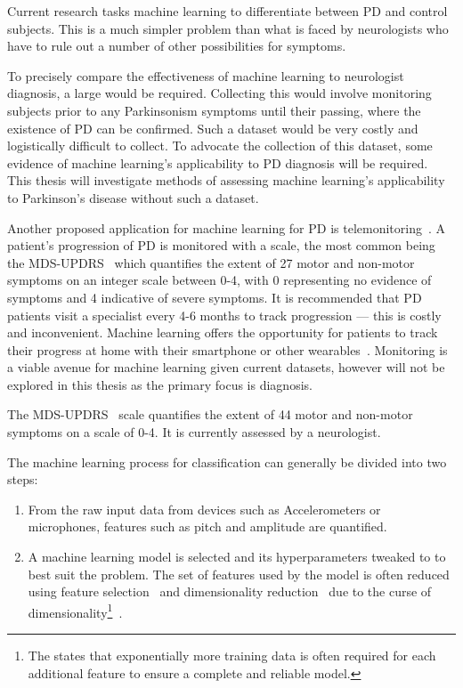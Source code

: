\documentclass[12pt, twoside]{book}
\renewcommand\emph[1]{\textit{\color{USred}{#1}}}
\begin{document}
\begin{highlight}
Current research tasks machine learning to differentiate between PD and control subjects. This is a much simpler problem than what is faced by neurologists who have to rule out a number of other possibilities for symptoms.
\end{highlight}

To precisely compare the effectiveness of machine learning to neurologist diagnosis, a large \emph{longitudinal dataset} would be required. Collecting this would involve monitoring subjects prior to any Parkinsonism symptoms until their passing, where the existence of PD can be confirmed. Such a dataset would be very costly and logistically difficult to collect. To advocate the collection of this dataset, some evidence of machine learning's applicability to PD diagnosis will be required. This thesis will investigate methods of assessing machine learning's applicability to Parkinson's disease without such a dataset.  

Another proposed application for machine learning for PD is telemonitoring~\cite{splittledysphonia2009, sptsanastelemonitor2010}. A patient's progression of PD is monitored with a scale, the most common being the MDS-UPDRS~\cite{updrs} which quantifies the extent of 27 motor and non-motor symptoms on an integer scale between 0-4, with 0 representing no evidence of symptoms and 4 indicative of severe symptoms. It is recommended that PD patients visit a specialist every 4-6 months to track progression --- this is costly and inconvenient. Machine learning offers the opportunity for patients to track their progress at home with their smartphone or other wearables~\cite{cancela2016monitoring}. Monitoring is a viable avenue for machine learning given current datasets, however will not be explored in this thesis as the primary focus is diagnosis.

\begin{highlight}[UPDRS]
The MDS-UPDRS~\cite{updrs} scale quantifies the extent of 44 motor and non-motor symptoms on a scale of 0-4. It is currently assessed by a neurologist.
\end{highlight}

The machine learning process for classification can generally be divided into two steps:
\begin{enumerate}[noitemsep, topsep=-10pt]
\item \emph{Feature engineering --- } From the raw input data from devices such as Accelerometers or microphones, features such as pitch and amplitude are quantified. 

\item \emph{Feature and Model selection -} A machine learning model is selected and its hyperparameters tweaked to to best suit the problem.  The set of features used by the model is often reduced using feature selection~\cite{featureselection} and dimensionality reduction~\cite{pca, ica} due to the curse of dimensionality\footnote{The \emph{curse of dimensionality} states that  exponentially more training data is often required for each additional feature to ensure a complete and reliable model.}~\cite{curseofdimensionality}. 
\end{enumerate}
\end{document}
